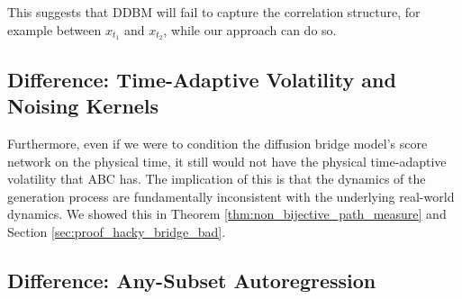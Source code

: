 \documentclass{article}
\begin{document}
This suggests that DDBM will fail to capture the correlation structure, for example between $x_{t_1}$ and $x_{t_2}$, while our approach can do so.







\subsection{Difference: Time-Adaptive Volatility and Noising Kernels}

Furthermore, even if we were to condition the diffusion bridge model's score network on the physical time, it still would not have the physical time-adaptive volatility that ABC has. The implication of this is that the dynamics of the generation process are fundamentally inconsistent with the underlying real-world dynamics. We showed this in Theorem \ref{thm:non_bijective_path_measure} and Section \ref{sec:proof_hacky_bridge_bad}.

\subsection{Difference: Any-Subset Autoregression}
\end{document}
